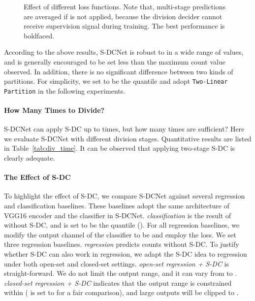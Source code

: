 \documentclass[10pt,twocolumn,letterpaper]{article}
\begin{document}
\begin{figure*}
\begin{minipage}{\textwidth}
\begin{minipage}{.34\textwidth}
\begin{tabular}{|c|c|c|c|}
					\hline
				\end{tabular}
				\vspace{5pt}
				\caption{Effect of different loss functions. Note that, multi-stage predictions are averaged if  is not applied, because the division decider cannot receive supervision signal during training. The best performance is boldfaced.\newline}
\label{tab:loss_ablation} 
			\end{minipage}
			
		\end{minipage}
		\vspace{-10pt}
	\end{figure*}
	
	According to the above results, S-DCNet is robust to  in a wide range of values, and  is generally encouraged to be set less than the maximum count value observed. In addition, there is no significant difference between two kinds of partitions. For simplicity, we set  to be the  quantile and adopt \texttt{Two-Linear Partition} in the following experiments.
	
	\vspace{-10pt}
	\paragraph{How Many Times to Divide?}
S-DCNet can apply S-DC up to  times, but how many times are sufficient? Here we evaluate S-DCNet with different division stages. Quantitative results are listed in Table~\ref{tab:div_time}. It can be observed that applying two-stage S-DC is clearly adequate.
	
	\vspace{-10pt}
	\paragraph{The Effect of S-DC}
	To highlight the effect of S-DC, we compare S-DCNet against several regression and classification baselines. These baselines adopt the same architecture of VGG16 encoder and the classifier in S-DCNet. \textit{classification} is the result of  without S-DC, and  is set to be the  quantile (). For all regression baselines, we modify the output channel of the classifier to be  and employ the  loss. We set three regression baselines. \textit{regression} predicts counts without S-DC. To justify whether S-DC can also work in regression, we adapt the S-DC idea to regression under both open-set and closed-set settings. \textit{open-set regression + S-DC} is straight-forward. We do not limit the output range, and it can vary from  to . \textit{closed-set regression + S-DC} indicates that the output range is constrained within  ( is set to  for a fair comparison), and large outputs will be clipped to .
	
\end{document}
